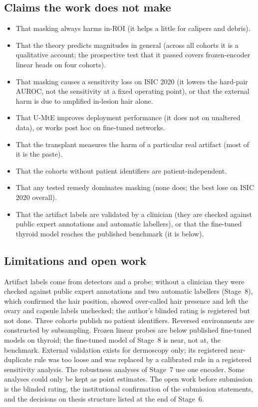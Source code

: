 \subsection{Claims the work does not make}
\begin{itemize}[leftmargin=*]\itemsep1pt
\item That masking always harms in-ROI (it helps a little for calipers and debris).
\item That the theory predicts magnitudes in general (across all cohorts it is a qualitative account; the prospective
test that it passed covers frozen-encoder linear heads on four cohorts).
\item That masking causes a sensitivity loss on ISIC 2020 (it lowers the hard-pair AUROC, not the sensitivity at a fixed
operating point), or that the external harm is due to amplified in-lesion hair alone.
\item That U-MtE improves deployment performance (it does not on unaltered data), or works post hoc on fine-tuned networks.
\item That the transplant measures the harm of a particular real artifact (most of it is the paste).
\item That the cohorts without patient identifiers are patient-independent.
\item That any tested remedy dominates masking (none does; the best lose on ISIC 2020 overall).
\item That the artifact labels are validated by a clinician (they are checked against public expert annotations and
automatic labellers), or that the fine-tuned thyroid model reaches the published benchmark (it is \sEightFTZeroGap{} below).
\end{itemize}

\subsection{Limitations and open work}
Artifact labels come from detectors and a probe; without a clinician they were checked against public expert
annotations and two automatic labellers (Stage~8), which confirmed the hair position, showed over-called hair presence and
left the ovary and capsule labels unchecked; the author's blinded rating is registered but not done. Three cohorts publish no patient identifiers. Reversed environments are constructed by subsampling.
Frozen linear probes are below published fine-tuned models on thyroid; the fine-tuned model of Stage~8 is near, not at,
the benchmark. External validation exists for dermoscopy only;
its registered near-duplicate rule was too loose and was replaced by a calibrated rule in a registered sensitivity
analysis. The robustness analyses of Stage~7 use one
encoder.
Some analyses could only be kept as point estimates. The open work before submission is the blinded rating, the
institutional confirmation of the submission statements, and the decisions on thesis structure listed at the end of
Stage~6.

